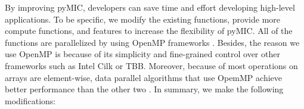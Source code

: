 
By improving pyMIC, developers can save time and effort developing high-level applications. To be specific, we modify the existing functions, provide more compute functions, and features to increase the flexibility of pyMIC. All of the functions are parallelized by using OpenMP frameworks \cite{openmp}. Besides, the reason we use OpenMP is because of its simplicity and fine-grained control over other frameworks such as Intel Cilk or TBB. Moreover, because of most operations on arrays are element-wise, data parallel algorithms that use OpemMP achieve better performance than the other two \cite{tousimojarad2014comparison}. In summary, we make the following modifications:

